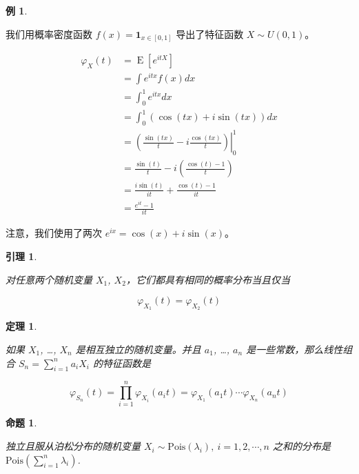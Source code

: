 \documentclass[
  12pt,
]{krantz}
\newtheorem{theorem}{定理}[chapter]
\newtheorem{lemma}{引理}[chapter]
\newtheorem{proposition}{命题}[chapter]
\theoremstyle{definition}
\theoremstyle{definition}
\newtheorem{example}{例}[chapter]
\theoremstyle{definition}
\theoremstyle{definition}
\theoremstyle{remark}
\begin{document}
\begin{example}
\protect\hypertarget{exm:unlabeled-div-2}{}\label{exm:unlabeled-div-2}

我们用概率密度函数 \(f(x)=\mathbf{1}_{x \in [0,1]}\) 导出了特征函数 \(X\sim U(0,1)\)。

\begin{equation*}
\begin{split}
\varphi _{X}(t) &= \operatorname {E} \left[e^{itX}\right]\\
 & =\int e^{itx}f(x)dx\\
 & =\int_{0}^{1}e^{itx}dx\\
 & =\int_{0}^{1}\left(\cos(tx)+i\sin(tx)\right)dx\\
 & =\left.\left(\frac{\sin(tx)}{t}-i\frac{\cos(tx)}{t}\right)\right|_{0}^{1}\\
 & =\frac{\sin(t)}{t}-i\left(\frac{\cos(t)-1}{t}\right)\\
 & =\frac{i\sin(t)}{it}+\frac{\cos(t)-1}{it}\\
 & =\frac{e^{it}-1}{it}
\end{split}
\end{equation*}

注意，我们使用了两次 \(e^{ix}=\cos(x)+i\sin(x)\)。

\end{example}

\begin{lemma}
\protect\hypertarget{lem:chf-pdf}{}\label{lem:chf-pdf}

对任意两个随机变量 \(X_1\), \(X_2\)，它们都具有相同的概率分布当且仅当

\[\varphi _{X_1}(t)=\varphi _{X_2}(t)\]

\end{lemma}

\begin{theorem}
\protect\hypertarget{thm:chf-sum}{}\label{thm:chf-sum}

如果 \(X_1\), \ldots, \(X_n\) 是相互独立的随机变量。并且 \(a_1\), \ldots, \(a_n\) 是一些常数，那么线性组合 \(S_n=\sum_{i=1}^na_iX_i\) 的特征函数是

\[\varphi _{S_{n}}(t)=\prod_{i=1}^n\varphi _{X_i}(a_{i}t)=\varphi _{X_{1}}(a_{1}t)\cdots \varphi _{X_{n}}(a_{n}t)\]

\end{theorem}

\begin{proposition}
\protect\hypertarget{prp:unlabeled-div-3}{}\label{prp:unlabeled-div-3}

独立且服从泊松分布的随机变量 \(X_i \sim \mathrm{Pois}(\lambda_i),\: i=1,2,\cdots,n\) 之和的分布是 \(\mathrm{Pois}(\sum_{i=1}^n\lambda_i)\).

\end{proposition}
\end{document}
